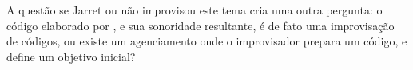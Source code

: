 A questão se Jarret ou não improvisou este tema cria uma outra pergunta: o código elaborado por , e sua sonoridade resultante, é de fato uma improvisação de códigos, ou existe um agenciamento onde o improvisador prepara um código, e define um objetivo inicial?






